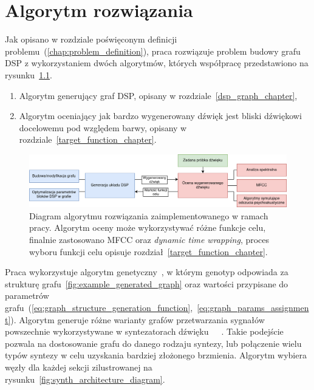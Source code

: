 \chapter{Algorytm rozwiązania}\label{chap:solution_algorithm}

Jak opisano w rozdziale poświęconym definicji problemu~(\ref{chap:problem_definition}), praca
rozwiązuje problem budowy grafu DSP z wykorzystaniem dwóch algorytmów, których współpracę przedstawiono na
rysunku~\ref{fig:solution_algorithm_diagram}.

\begin{enumerate}
  \item Algorytm generujący graf DSP, opisany w rozdziale~\ref{dsp_graph_chapter},
  \item Algorytm oceniający jak bardzo wygenerowany dźwięk jest bliski dźwiękowi docelowemu pod względem barwy,
    opisany w rozdziale~\ref{target_function_chapter}.
\end{enumerate}

\begin{figure}[H]    
    \centering
    \includegraphics[width=1.0\linewidth]{rys04/solution_algorithm_diagram.png}
    \caption{
      Diagram algorytmu rozwiązania zaimplementowanego w ramach pracy.
      Algorytm oceny może wykorzystywać różne funkcje celu, finalnie zastosowano
      MFCC oraz \textit{dynamic time wrapping},
      proces wyboru funkcji celu opisuje rozdział~\ref{target_function_chapter}.
    }\label{fig:solution_algorithm_diagram}
\end{figure}

Praca wykorzystuje algorytm genetyczny~\cite{2020SciPy-NMeth}, w którym genotyp odpowiada za
strukturę grafu~\ref{fig:example_generated_graph} oraz wartości
przypisane do parametrów grafu~(\ref{eq:graph_structure_generation_function},~\ref{eq:graph_params_assignment}).
Algorytm generuje różne warianty grafów przetwarzania sygnałów powszechnie
wykorzystywane w syntezatorach dźwięku~\cite{minilogue_diagram}~\cite{digitone_manual}~\cite{yamaha_dx7_manual}.
Takie podejście pozwala na dostosowanie grafu do danego rodzaju syntezy,
lub połączenie wielu typów syntezy w celu uzyskania bardziej złożonego brzmienia.
Algorytm wybiera węzły dla każdej sekcji
zilustrowanej na rysunku~\ref{fig:synth_architecture_diagram}.

